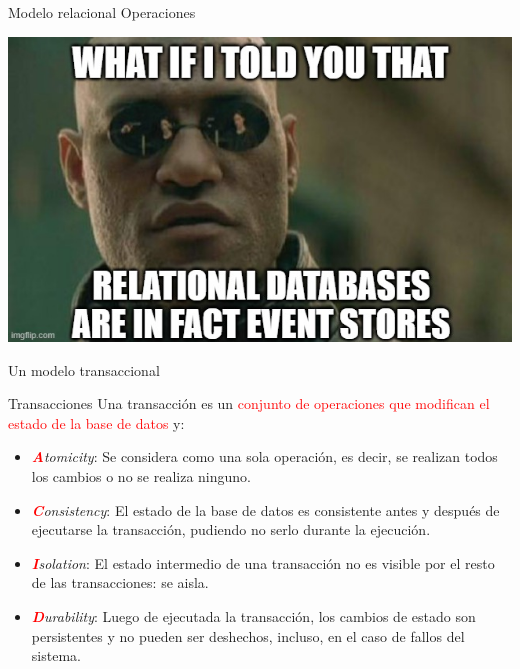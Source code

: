 \begin{frame}{Modelo relacional}
    \centering
    \Huge \textcolor{blue3}{Operaciones}
\end{frame}

{
{
    \includegraphics[width=\paperwidth,height=\paperheight]{img/events.jpg}
}
\begin{frame}
\end{frame}
}

\begin{frame}{Un modelo transaccional}
    \begin{block}{Transacciones}
        Una transacci\'on es un \textcolor{red}{conjunto de operaciones que
        modifican el estado de la base de datos} y:

        \begin{itemize}
            \item<2-> \textit{\textcolor{red}{\textbf{\it A}}tomicity}: Se considera como una sola operaci\'on, es decir, se
            realizan todos los cambios o no se realiza ninguno.
            \item<3-> \textit{\textcolor{red}{\textbf{\it C}}onsistency}: El estado de la base de datos es consistente antes y despu\'es de ejecutarse la transacci\'on, pudiendo no serlo durante la ejecuci\'on.
            \item<4-> \textit{\textcolor{red}{\textbf{\it I}}solation}: El estado intermedio de una transacci\'on no
            es visible por el resto de las transacciones: se aisla.
            \item<5-> \textit{\textcolor{red}{\textbf{\it D}}urability}: Luego de ejecutada la transacci\'on, los cambios
            de estado son persistentes y no pueden ser deshechos, incluso, en el caso
            de fallos del sistema.
        \end{itemize}
        
    \end{block}

\end{frame}

